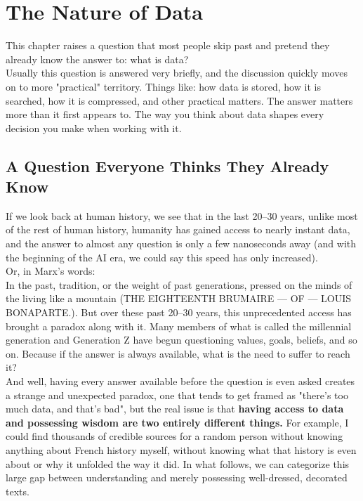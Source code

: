 \chapter{The Nature of Data}
\label{ch:nature-of-data}

This chapter raises a question that most people skip past and pretend they already know the answer to: what is data?\\
Usually this question is answered very briefly, and the discussion quickly moves on to more "practical" territory. Things like:
how data is stored, how it is searched, how it is compressed, and other practical matters. The answer matters more than it first appears to. The way you think about data shapes every decision you make when working with it.

\section{A Question Everyone Thinks They Already Know}
\label{sec:question-everyone-thinks-they-know}

If we look back at human history, we see that in the last 20--30 years, unlike most of the rest of human history, humanity has gained access to nearly instant data, and the answer to almost any question is only a few nanoseconds away (and with the beginning of the AI era, we could say this speed has only increased).\\
Or, in Marx's words:\\
In the past, tradition, or the weight of past generations, pressed on the minds of the living like a mountain (THE EIGHTEENTH BRUMAIRE --- OF --- LOUIS BONAPARTE.). But over these past 20--30 years, this unprecedented access has brought a paradox along with it. Many members of what is called the millennial generation and Generation Z have begun questioning values, goals, beliefs, and so on. Because if the answer is always available, what is the need to suffer to reach it?\\
And well, having every answer available before the question is even asked creates a strange and unexpected paradox, one that tends to get framed as "there's too much data, and that's bad", but the real issue is that \textbf{having access to data and possessing wisdom are two entirely different things.} For example, I could find thousands of credible sources for a random person without knowing anything about French history myself, without knowing what that history is even about or why it unfolded the way it did. In what follows, we can categorize this large gap between understanding and merely possessing well-dressed, decorated texts.

